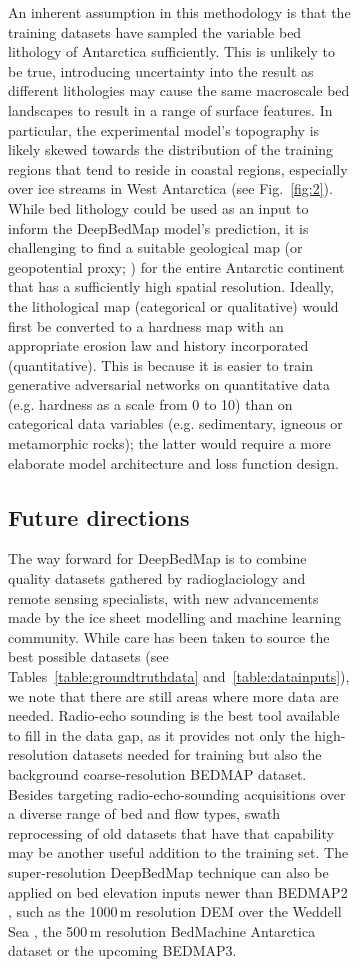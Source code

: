 \documentclass[tc, noline]{copernicus}
\begin{document}
\begin{figure}[t]
\begin{figure}[t]
An inherent assumption in this methodology is that the training datasets have sampled the variable bed lithology of Antarctica \citep{CoxGeoMAPdatasetAntarctic2018} sufficiently.
This is unlikely to be true, introducing uncertainty into the result as different lithologies may cause the same macroscale bed landscapes to result in a range of surface features.
In particular, the experimental model's topography is likely skewed towards the distribution of the training regions that tend to reside in coastal regions, especially over ice streams in West Antarctica (see Fig.~\ref{fig:2}).
While bed lithology could be used as an input to inform the DeepBedMap model's prediction, it is challenging to find a suitable geological map (or geopotential proxy; \citealp[see e.g.][]{AitkensubglacialgeologyWilkes2014,CoxGeoMAPdatasetAntarctic2018}) for the entire Antarctic continent that has a sufficiently high spatial resolution.
Ideally, the lithological map (categorical or qualitative) would first be converted to a hardness map with an appropriate erosion law and history incorporated (quantitative).
This is because it is easier to train generative adversarial networks on quantitative data (e.g. hardness as a scale from 0 to 10) than on categorical data variables (e.g. sedimentary, igneous or metamorphic rocks); the latter would require a more elaborate model architecture and loss function design.

\subsection{Future directions} \label{section:futuredirections}

The way forward for DeepBedMap is to combine quality datasets gathered by radioglaciology and remote sensing specialists, with new advancements made by the ice sheet modelling and machine learning community.
While care has been taken to source the best possible datasets (see Tables~\ref{table:groundtruthdata} and~\ref{table:datainputs}), we note that there are still areas where more data are needed.
Radio-echo sounding is the best tool available to fill in the data gap, as it provides not only the high-resolution datasets needed for training but also the background coarse-resolution BEDMAP dataset.
Besides targeting radio-echo-sounding acquisitions over a diverse range of bed and flow types, swath reprocessing of old datasets that have that capability \citep{HolschuhLinkingpostglaciallandscapes2020} may be another useful addition to the training set.
The super-resolution DeepBedMap technique can also be applied on bed elevation inputs newer than BEDMAP2 \citep{FretwellBedmap2improvedice2013}, such as the 1000\,\unit{m} resolution DEM over the Weddell Sea \citep{Jeofry1KmBedTopography2017}, the 500\,\unit{m} resolution BedMachine Antarctica dataset \citep{MorlighemMEaSUREsBedMachineAntarctica2019} or the upcoming BEDMAP3.


\end{figure}
\end{figure}
\end{document}
